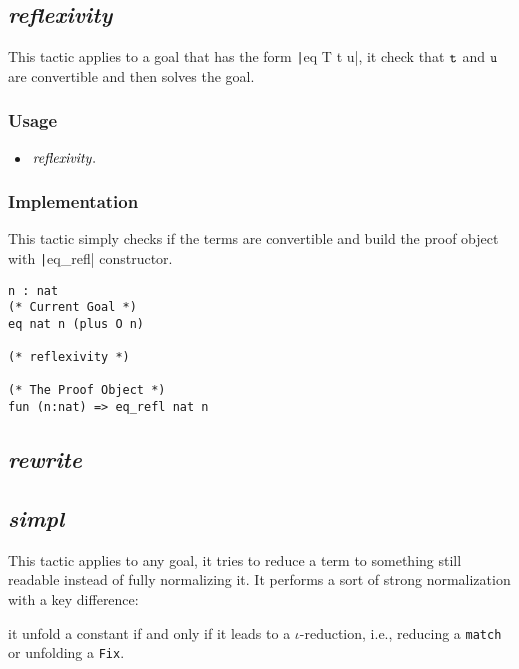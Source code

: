 \subsection{\it reflexivity}
This tactic applies to a goal that has the form \texttt|eq T t u|, it check that $\tt t$ and $\tt u$ 
are convertible and then solves the goal.

\subsubsection*{Usage}
\begin{itemize}
\item ${\it reflexivity}.$
\end{itemize}

\subsubsection*{Implementation}
This tactic simply checks if the terms are convertible and build the proof object with \texttt|eq_refl| constructor.

\begin{center}
\begin{minipage}{0.7\textwidth}
\begin{verbatim}
n : nat
(* Current Goal *)  
eq nat n (plus O n)   

(* reflexivity *)

(* The Proof Object *)
fun (n:nat) => eq_refl nat n
\end{verbatim}
\end{minipage}
\end{center}

\subsection{\it rewrite}


\subsection{\it simpl}
This tactic applies to any goal, it tries to reduce a term to something still readable instead of fully normalizing it. 
It performs a sort of strong normalization with a key difference:
\begin{center}
\begin{minipage}{0.7\textwidth}
it unfold a constant if and only if it leads to a $\iota$-reduction, i.e., reducing a {\tt match} or unfolding a {\tt Fix}.
\end{minipage}
\end{center}


